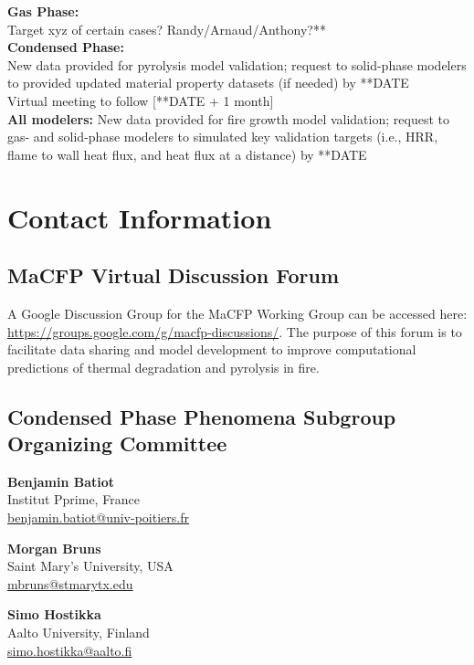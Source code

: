 \documentclass[12pt,demo]{article}
\begin{document}
\textbf{Gas Phase:}\\
Target xyz of certain cases? Randy/Arnaud/Anthony?**\\

\textbf{Condensed Phase:}\\
New data provided for pyrolysis model validation; request to solid-phase modelers to provided updated material property datasets (if needed) by **DATE\\
Virtual meeting to follow [**DATE + 1 month]\\

\textbf{All modelers:}
New data provided for fire growth model validation; request to gas- and solid-phase modelers to simulated key validation targets (i.e., HRR, flame to wall heat flux, and heat flux at a distance) by **DATE\\


\clearpage
\section{Contact Information}
 \subsection*{MaCFP Virtual Discussion Forum}
A Google Discussion Group for the MaCFP Working Group can be accessed here: \url{https://groups.google.com/g/macfp-discussions/}. The purpose of this forum is to facilitate data sharing and model development to improve computational predictions of thermal degradation and pyrolysis in fire.

\subsection*{Condensed Phase Phenomena Subgroup Organizing Committee}
\setlength{\parindent}{0cm}
\textbf{Benjamin Batiot} \\
Institut Pprime, France \\
    \quad\href{mailto:benjamin.batiot@univ-poitiers.fr }{benjamin.batiot@univ-poitiers.fr }
    \vspace{0.5cm}
    
\textbf{Morgan Bruns} \\
Saint Mary's University, USA\\
\href{mailto:mbruns@stmarytx.edu}{mbruns@stmarytx.edu}
    \vspace{0.5cm}

\textbf{Simo Hostikka} \\
    Aalto University, Finland\\
    \href{mailto:simo.hostikka@aalto.fi}{simo.hostikka@aalto.fi}
   \vspace{0.5cm}
\end{document}
